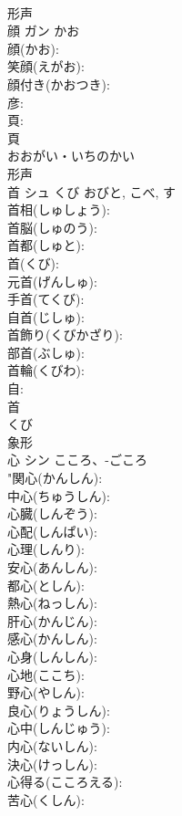 \documentclass[8pt]{extreport}
\begin{document}
\begin{CJK}{UTF8}{min}
\\	形声 
\\	顔	ガン	かお		
\\	顔(かお): 
\\	笑顔(えがお): 
\\	顔付き(かおつき): 
\\	彦: 
\\	頁: 
\\	頁	
\\	おおがい・いちのかい	
\\	形声 
\\	首	シュ	くび	おびと, こべ, す	
\\	首相(しゅしょう): 
\\	首脳(しゅのう): 
\\	首都(しゅと): 
\\	首(くび): 
\\	元首(げんしゅ): 
\\	手首(てくび): 
\\	自首(じしゅ): 
\\	首飾り(くびかざり): 
\\	部首(ぶしゅ): 
\\	首輪(くびわ): 
\\	自: 
\\	首	
\\	くび	
\\	象形 
\\	心	シン	こころ、-ごころ		
\\	"関心(かんしん): 
\\	中心(ちゅうしん): 
\\	心臓(しんぞう): 
\\	心配(しんぱい): 
\\	心理(しんり): 
\\	安心(あんしん): 
\\	都心(としん): 
\\	熱心(ねっしん): 
\\	肝心(かんじん): 
\\	感心(かんしん): 
\\	心身(しんしん): 
\\	心地(ここち): 
\\	野心(やしん): 
\\	良心(りょうしん): 
\\	心中(しんじゅう): 
\\	内心(ないしん): 
\\	決心(けっしん): 
\\	心得る(こころえる): 
\\	苦心(くしん): 

\end{CJK}
\end{document}
